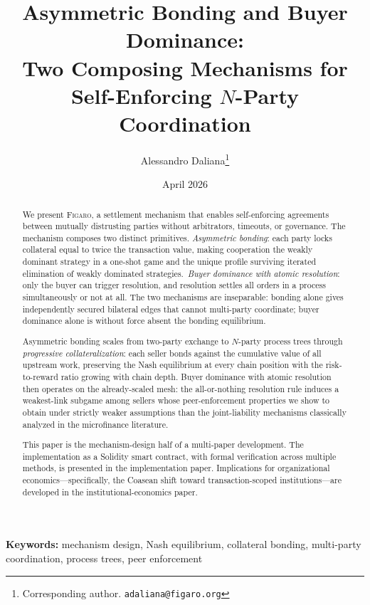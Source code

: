 \documentclass[11pt,a4paper]{article}
\title{%
  Asymmetric Bonding and Buyer Dominance:\\
  Two Composing Mechanisms for Self-Enforcing $N$-Party Coordination%
}
\author{
  Alessandro Daliana\thanks{Corresponding author. \texttt{adaliana@figaro.org}}
}
\date{April 2026}
\theoremstyle{definition}
\theoremstyle{remark}
\newcommand{\figaro}{\textsc{Figaro}}
\begin{document}
\maketitle

\begin{abstract}
We present \figaro, a settlement mechanism that enables self-enforcing
agreements between mutually distrusting parties without arbitrators,
timeouts, or governance. The mechanism composes two distinct primitives.
\emph{Asymmetric bonding}: each party locks collateral equal to twice
the transaction value, making cooperation the weakly dominant strategy
in a one-shot game and the unique profile surviving iterated elimination
of weakly dominated strategies.\ \emph{Buyer dominance with atomic
resolution}: only the buyer can trigger resolution, and resolution
settles all orders in a process simultaneously or not at all. The two
mechanisms are inseparable: bonding alone gives independently secured
bilateral edges that cannot multi-party coordinate; buyer dominance
alone is without force absent the bonding equilibrium.

Asymmetric bonding scales from two-party exchange to $N$-party process
trees through \emph{progressive collateralization}: each seller bonds
against the cumulative value of all upstream work, preserving the Nash
equilibrium at every chain position with the risk-to-reward ratio
growing with chain depth. Buyer dominance with atomic resolution then
operates on the already-scaled mesh: the all-or-nothing resolution rule
induces a weakest-link subgame among sellers whose peer-enforcement
properties we show to obtain under strictly weaker assumptions than the
joint-liability mechanisms classically analyzed in the microfinance
literature.

This paper is the mechanism-design half of a multi-paper development.
The implementation as a Solidity smart contract, with formal
verification across multiple methods, is presented in the
implementation paper. Implications for organizational
economics---specifically, the Coasean shift toward transaction-scoped
institutions---are developed in the institutional-economics paper.
\end{abstract}

\medskip
\noindent\textbf{Keywords:}
mechanism design, Nash equilibrium, collateral bonding,
multi-party coordination, process trees, peer enforcement

\end{document}
